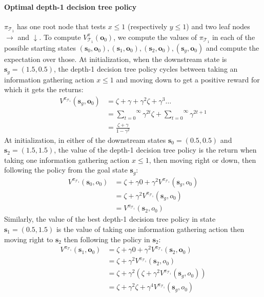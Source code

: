 \paragraph{Optimal depth-1 decision tree policy} $\pi_{\mathcal{T}_1}$ has one root node that tests $x\leq1$ (respectively $y\leq1$) and two leaf nodes $\rightarrow$ and $\downarrow$. 
    To compute $V^\pi_{\mathcal{T}_1}(\boldsymbol{o}_0)$, we compute the values of $\pi_{\mathcal{T}_1}$ in each of the possible starting states $(\boldsymbol{s}_0, \boldsymbol{o}_0), (\boldsymbol{s}_1, \boldsymbol{o}_0), (\boldsymbol{s}_2, \boldsymbol{o}_0), (\boldsymbol{s}_g, \boldsymbol{o}_0)$ and compute the expectation over those. 
    At initialization, when the downstream state is $\boldsymbol{s}_g = (1.5, 0.5)$, the depth-1 decision tree policy cycles between taking an information gathering action $x\leq1$ and moving down to get a positive reward for which it gets the returns:
    \begin{align*}
        V^{\pi_{\mathcal{T}_1}} (\boldsymbol{s}_g, \boldsymbol{o}_0) &= \zeta + \gamma + \gamma^2 \zeta + \gamma^3 \dots \\
        &= \overset{\infty}{\underset{t=0}\sum} \gamma^{2t} \zeta + \overset{\infty}{\underset{t=0}\sum} \gamma^{2t+1} \\
        &= \frac{\zeta + \gamma}{1 - \gamma^2}
    \end{align*}
    At initialization, in either of the downstream states $\boldsymbol{s}_0=(0.5,0.5)$ and $\boldsymbol{s}_2=(1.5, 1.5)$, the value of the depth-1 decision tree policy is the return when taking one information gathering action $x\leq1$, then moving right or down, then following the policy from the goal state $\boldsymbol{s}_g$:
    \begin{align*}
        V^{\pi_{\mathcal{T}_1}} (\boldsymbol{s}_0, o_0) &= \zeta + \gamma 0 + \gamma^2 V^{\pi_{\mathcal{T}_1}} (\boldsymbol{s}_g, o_0) \\
        &= \zeta + \gamma^2 V^{\pi_{\mathcal{T}_1}} (\boldsymbol{s}_g, o_0) \\
        &= V^{\pi_{\mathcal{T}_1}} (\boldsymbol{s}_2, o_0)
    \end{align*}
    Similarly, the value of the best depth-1 decision tree policy in state $\boldsymbol{s}_1=(0.5,1.5)$ is the value of taking one information gathering action then moving right to $\boldsymbol{s}_2$ then following the policy in $\boldsymbol{s}_2$:
    \begin{align*}
        V^{\pi_{\mathcal{T}_1}} (\boldsymbol{s}_1, \boldsymbol{o}_0) &= \zeta + \gamma 0 + \gamma^2 V^{\pi_{\mathcal{T}_1}} (\boldsymbol{s}_2, \boldsymbol{o}_0) \\
        &= \zeta + \gamma^2 V^{\pi_{\mathcal{T}_1}} (\boldsymbol{s}_2, o_0) \\
        &= \zeta + \gamma^2 (\zeta + \gamma^2 V^{\pi_{\mathcal{T}_1}} (\boldsymbol{s}_g, o_0)) \\
        &= \zeta + \gamma^2 \zeta + \gamma^4 V^{\pi_{\mathcal{T}_1}} (\boldsymbol{s}_g, o_0)
    \end{align*}
